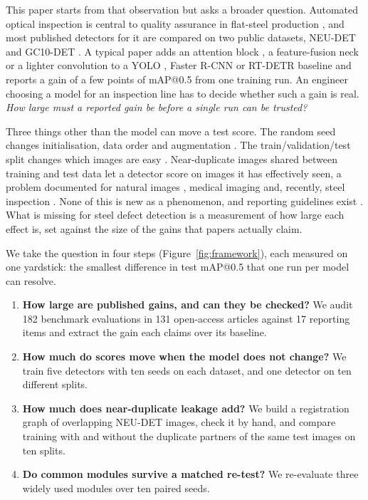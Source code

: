 \documentclass[pdflatex,sn-apa]{sn-jnl}
\begin{document}
This paper starts from that observation but asks a broader question. Automated optical inspection is central to quality assurance in flat-steel production \citep{song2013neu,he2020neu,lv2020gc10,tabernik2020segmentation,czimmermann2020visual,luo2020automated,cheng2026survey}, and most published detectors for it are compared on two public datasets, NEU-DET \citep{song2013neu,he2020neu} and GC10-DET \citep{lv2020gc10}. A typical paper adds an attention block \citep{woo2018cbam,ouyang2023ema}, a feature-fusion neck \citep{tan2020efficientdet,wei2026amfnet,liu2025sfc} or a lighter convolution \citep{wang2023_pmc10300763,zhang2023_pmc10582940,ma2023_pmc10675464,wang2026_pmc13029871,li2026dpsnet} to a YOLO \citep{jocher2024yolo}, Faster R-CNN \citep{ren2015faster} or RT-DETR \citep{zhao2024rtdetr} baseline and reports a gain of a few points of mAP@0.5 from one training run. An engineer choosing a model for an inspection line has to decide whether such a gain is real. \emph{How large must a reported gain be before a single run can be trusted?}

Three things other than the model can move a test score. The random seed changes initialisation, data order and augmentation \citep{bouthillier2021accounting,pineau2021improving}. The train/validation/test split changes which images are easy \citep{lema2025reproducible}. Near-duplicate images shared between training and test data let a detector score on images it has effectively seen, a problem documented for natural images \citep{barz2020cifair,recht2019imagenet,ramos2025leakage}, medical imaging \citep{tampu2022inflation,roberts2021common,varoquaux2022evaluating} and, recently, steel inspection \citep{technologies2026review,molleda2026edge}. None of this is new as a phenomenon, and reporting guidelines exist \citep{gundersen2018state,kapoor2024reforms}. What is missing for steel defect detection is a measurement of how large each effect is, set against the size of the gains that papers actually claim.

We take the question in four steps (Figure~\ref{fig:framework}), each measured on one yardstick: the smallest difference in test mAP@0.5 that one run per model can resolve.
\begin{enumerate}[leftmargin=2em]
    \item \textbf{How large are published gains, and can they be checked?} We audit 182 benchmark evaluations in 131 open-access articles against 17 reporting items and extract the gain each claims over its baseline.
    \item \textbf{How much do scores move when the model does not change?} We train five detectors with ten seeds on each dataset, and one detector on ten different splits.
    \item \textbf{How much does near-duplicate leakage add?} We build a registration graph of overlapping NEU-DET images, check it by hand, and compare training with and without the duplicate partners of the same test images on ten splits.
    \item \textbf{Do common modules survive a matched re-test?} We re-evaluate three widely used modules over ten paired seeds.
\end{enumerate}
\end{document}
